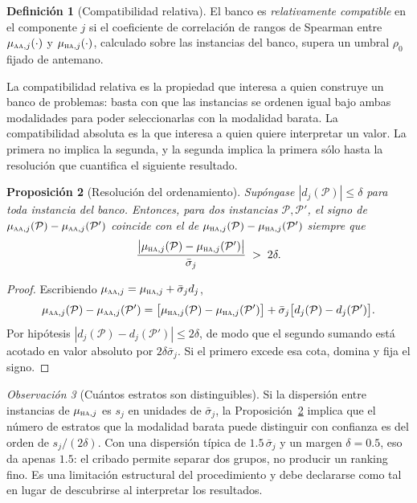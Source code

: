\documentclass[11pt,a4paper]{article}
\theoremstyle{definition}
\newtheorem{definicion}{Definición}[section]
\theoremstyle{plain}
\newtheorem{proposicion}[definicion]{Proposición}
\theoremstyle{remark}
\newtheorem{observacion}[definicion]{Observación}
\newcommand{\modAA}{\textsc{aa}}
\newcommand{\modHA}{\textsc{ha}}
\begin{document}
\begin{definicion}[Compatibilidad relativa]\label{def:relativa}
El banco es \emph{relativamente compatible} en el componente $j$ si el coeficiente
de correlación de rangos de Spearman entre
$\mu_{\modAA,j}(\cdot)$ y $\mu_{\modHA,j}(\cdot)$, calculado sobre las instancias
del banco, supera un umbral $\rho_0$ fijado de antemano.
\end{definicion}

La compatibilidad relativa es la propiedad que interesa a quien construye un banco
de problemas: basta con que las instancias se ordenen igual bajo ambas modalidades
para poder seleccionarlas con la modalidad barata. La compatibilidad absoluta es
la que interesa a quien quiere interpretar un valor. La primera no implica la
segunda, y la segunda implica la primera sólo hasta la resolución que cuantifica
el siguiente resultado.

\begin{proposicion}[Resolución del ordenamiento]\label{prop:resolucion}
Supóngase $|d_j(\mathcal{P})|\le\delta$ para toda instancia del banco. Entonces,
para dos instancias $\mathcal{P},\mathcal{P}'$, el signo de
$\mu_{\modAA,j}(\mathcal{P})-\mu_{\modAA,j}(\mathcal{P}')$ coincide con el de
$\mu_{\modHA,j}(\mathcal{P})-\mu_{\modHA,j}(\mathcal{P}')$ siempre que
\[
  \frac{\big|\mu_{\modHA,j}(\mathcal{P})-\mu_{\modHA,j}(\mathcal{P}')\big|}{\bar\sigma_j}\;>\;2\delta .
\]
\end{proposicion}

\begin{proof}
Escribiendo $\mu_{\modAA,j}=\mu_{\modHA,j}+\bar\sigma_j d_j$,
\[
  \mu_{\modAA,j}(\mathcal{P})-\mu_{\modAA,j}(\mathcal{P}')
  =\big[\mu_{\modHA,j}(\mathcal{P})-\mu_{\modHA,j}(\mathcal{P}')\big]
  +\bar\sigma_j\big[d_j(\mathcal{P})-d_j(\mathcal{P}')\big].
\]
Por hipótesis $|d_j(\mathcal{P})-d_j(\mathcal{P}')|\le 2\delta$, de modo que el
segundo sumando está acotado en valor absoluto por $2\delta\bar\sigma_j$. Si el
primero excede esa cota, domina y fija el signo.
\end{proof}

\begin{observacion}[Cuántos estratos son distinguibles]\label{obs:estratos}
Si la dispersión entre instancias de $\mu_{\modHA,j}$ es $s_j$ en unidades de
$\bar\sigma_j$, la Proposición~\ref{prop:resolucion} implica que el número de
estratos que la modalidad barata puede distinguir con confianza es del orden de
$s_j/(2\delta)$. Con una dispersión típica de $1.5\,\bar\sigma_j$ y un margen
$\delta=0.5$, eso da apenas $1.5$: el cribado permite separar dos grupos, no
producir un ranking fino. Es una limitación estructural del procedimiento y debe
declararse como tal en lugar de descubrirse al interpretar los resultados.
\end{observacion}
\end{document}
